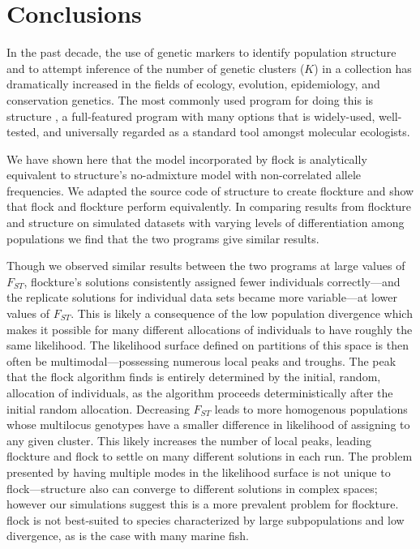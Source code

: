 \section*{Conclusions}
In the past decade, the use of genetic markers to identify population structure and to attempt inference of
the number of genetic clusters ($K$) in a collection has dramatically increased in the fields of ecology, evolution, 
epidemiology, and conservation
genetics. The most commonly used program for doing this is {\sc structure} \citep{Pritchardetal2000,Falushetal2003}, 
a full-featured program with many options that is widely-used, well-tested, and universally regarded as a standard tool amongst molecular ecologists. 


We have shown here that the model incorporated by {\sc flock} is analytically equivalent to {\sc structure}'s 
no-admixture model 
with non-correlated allele frequencies.
We adapted the source code of {\sc structure} to create {\sc flockture} and show that
{\sc flock} and {\sc flockture}  perform equivalently. 
In comparing results from {\sc flockture} and {\sc structure} 
on simulated datasets with varying levels of differentiation among populations
we find that the two programs give similar results.

Though we observed similar results
between the two programs at large values of $F_{ST}$, 
{\sc flockture}'s solutions consistently assigned fewer individuals correctly---and the
replicate solutions for individual data sets became more variable---at lower values of $F_{ST}$.
This is likely a consequence of the low population divergence which
makes it possible for many different allocations of individuals to
have roughly the same likelihood.
The likelihood surface defined on partitions of this space is then often
be multimodal---possessing numerous local peaks and troughs.
The peak that the {\sc flock} algorithm finds is entirely determined by the initial, random, allocation of 
individuals, as the algorithm proceeds deterministically after the initial random allocation.
Decreasing $F_{ST}$ leads to more homogenous 
populations whose multilocus genotypes have a smaller difference in 
likelihood of assigning to any given cluster. This likely increases the number of
local peaks, leading {\sc flockture} and {\sc flock} to settle on many different solutions in each run. The problem presented by having multiple modes in the likelihood surface 
is not unique to {\sc flock}---{\sc structure} also can converge to 
different solutions in complex spaces; however our simulations suggest this is a more  
prevalent problem for {\sc flockture}.
{\sc flock} is not best-suited to species characterized by large
subpopulations and low divergence, as is the case with many 
marine fish.   
   

